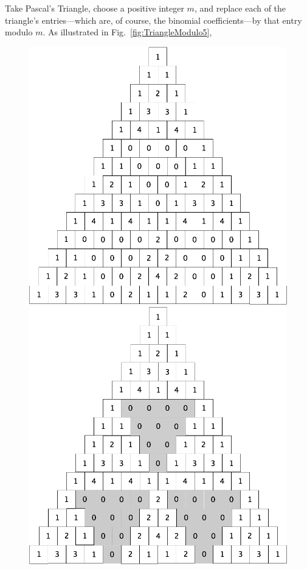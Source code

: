 \begin{enumerate}
Take Pascal's Triangle, choose a positive integer $m$, and replace each of the triangle's entries---which are, of course, the binomial coefficients---by that entry modulo $m$.  As illustrated in Fig.~\ref{fig:TriangleModulo5},
\begin{figure}[ht]
\begin{center}
	\includegraphics[scale=0.18]{FiguresArithmetic/TrianglePascalModulo5init.png}
	\hspace*{.1in}
	\includegraphics[scale=0.18]{FiguresArithmetic/TrianglePascalModulo5.png}

\end{center}
\end{figure}
\end{enumerate}
